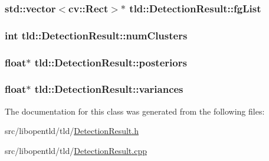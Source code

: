 \hypertarget{classtld_1_1_detection_result_ac640285c436ff5166d0ea34116d4dc69}{
\subsubsection[{fgList}]{\setlength{\rightskip}{0pt plus 5cm}std::vector$<$cv::Rect$>$$\ast$ {\bf tld::DetectionResult::fgList}}}
\label{classtld_1_1_detection_result_ac640285c436ff5166d0ea34116d4dc69}
\hypertarget{classtld_1_1_detection_result_aebf70a6b9d27b4cb34248ac26e5876ab}{
\subsubsection[{numClusters}]{\setlength{\rightskip}{0pt plus 5cm}int {\bf tld::DetectionResult::numClusters}}}
\label{classtld_1_1_detection_result_aebf70a6b9d27b4cb34248ac26e5876ab}
\hypertarget{classtld_1_1_detection_result_abe6b7a8cc4478cce6351207939e96333}{
\subsubsection[{posteriors}]{\setlength{\rightskip}{0pt plus 5cm}float$\ast$ {\bf tld::DetectionResult::posteriors}}}
\label{classtld_1_1_detection_result_abe6b7a8cc4478cce6351207939e96333}
\hypertarget{classtld_1_1_detection_result_ae0725362fbe07964e4ac6861fa1d32fb}{
\subsubsection[{variances}]{\setlength{\rightskip}{0pt plus 5cm}float$\ast$ {\bf tld::DetectionResult::variances}}}
\label{classtld_1_1_detection_result_ae0725362fbe07964e4ac6861fa1d32fb}


The documentation for this class was generated from the following files:\begin{DoxyCompactItemize}
\item 
src/libopentld/tld/\hyperlink{_detection_result_8h}{DetectionResult.h}\item 
src/libopentld/tld/\hyperlink{_detection_result_8cpp}{DetectionResult.cpp}\end{DoxyCompactItemize}
